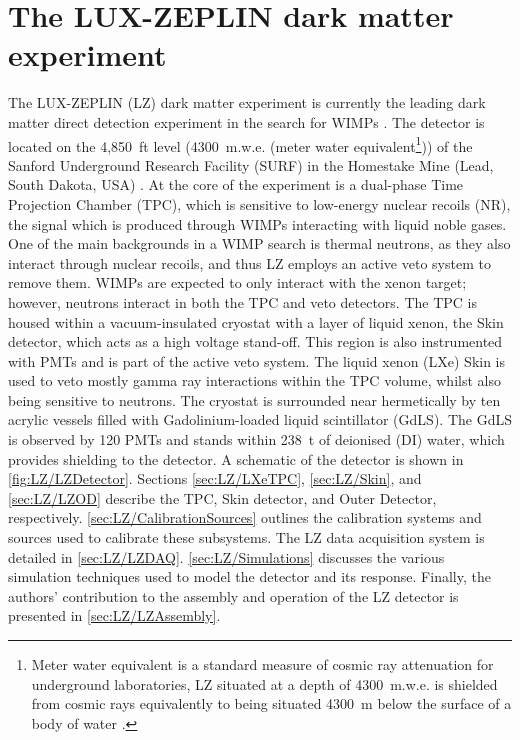 \chapter{The LUX-ZEPLIN dark matter experiment}\label{chap:LZExperiment}
The LUX-ZEPLIN (LZ) dark matter experiment is currently the leading dark matter direct detection experiment in the search for WIMPs \cite{LZ:2024zvo}. The detector is located on the 4,850~ft level (4300~m.w.e. (meter water equivalent\footnote{Meter water equivalent is a standard measure of cosmic ray attenuation for underground laboratories, LZ situated at a depth of 4300~m.w.e. is shielded from cosmic rays equivalently to being situated 4300~m below the surface of a body of water \cite{Grieder:2001ct}.})) of the Sanford Underground Research Facility (SURF) in the Homestake Mine (Lead, South Dakota, USA) \cite{LZNIMA}. At the core of the experiment is a dual-phase Time Projection Chamber (TPC), which is sensitive to low-energy nuclear recoils (NR), the signal which is produced through WIMPs interacting with liquid noble gases. One of the main backgrounds in a WIMP search is thermal neutrons, as they also interact through nuclear recoils, and thus LZ employs an active veto system to remove them. WIMPs are expected to only interact with the xenon target; however, neutrons interact in both the TPC and veto detectors.
The TPC is housed within a vacuum-insulated cryostat with a layer of liquid xenon, the Skin detector, which acts as a high voltage stand-off. This region is also instrumented with PMTs and is part of the active veto system. The liquid xenon (LXe) Skin is used to veto mostly gamma ray interactions within the TPC volume, whilst also being sensitive to neutrons. The cryostat is surrounded near hermetically by ten acrylic vessels filled with Gadolinium-loaded liquid scintillator (GdLS). The GdLS is observed by 120 PMTs and stands within 238~t of deionised (DI) water, which provides shielding to the detector. A schematic of the detector is shown in \autoref{fig:LZ/LZDetector}. 
Sections \ref{sec:LZ/LXeTPC}, \ref{sec:LZ/Skin}, and \ref{sec:LZ/LZOD} describe the TPC, Skin detector, and Outer Detector, respectively. \autoref{sec:LZ/CalibrationSources} outlines the calibration systems and sources used to calibrate these subsystems. The LZ data acquisition system is detailed in \autoref{sec:LZ/LZDAQ}. \autoref{sec:LZ/Simulations} discusses the various simulation techniques used to model the detector and its response. Finally, the authors' contribution to the assembly and operation of the LZ detector is presented in \autoref{sec:LZ/LZAssembly}.

